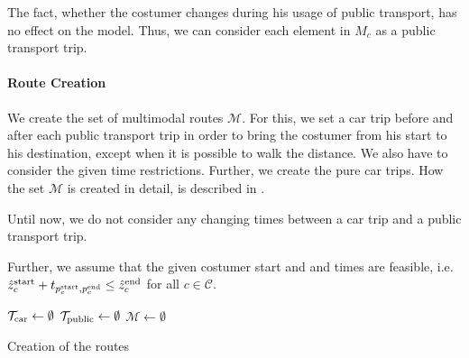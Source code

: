The fact, whether the costumer changes during his usage of public transport, has no effect on the model. Thus, we can consider each element in $M_c$ as a public transport trip.

\paragraph{Route Creation} \parfill

We create the set of multimodal routes $\mathcal{M}$. For this, we set a car trip before and after each public transport trip in order to bring the costumer from his start to his destination, except when it is possible to walk the distance. We also have to consider the given time restrictions. Further, we create the pure car trips. How the set $\mathcal{M}$ is created in detail, is described in .

Until now, we do not consider any changing times between a car trip and a public transport trip.

Further, we assume that the given costumer start and and times are feasible, i.e. $\hat{z}^{\operatorname{start}}_c+t_{p^{\operatorname{start}}_c,p^{\operatorname{end}}_c}\leq\hat{z}^{\operatorname{end}}_c$ for all $c\in\mathcal{C}$.

\begin{algorithm}
	\SetAlgoLined
	$\mathcal{T}_{\operatorname{car}}\gets\emptyset$\;
	$\mathcal{T}_{\operatorname{public}}\gets\emptyset$\;
	$\mathcal{M}\gets\emptyset$\;
	\caption{Creation of the routes \label{alg:route_creation}}
\end{algorithm}

